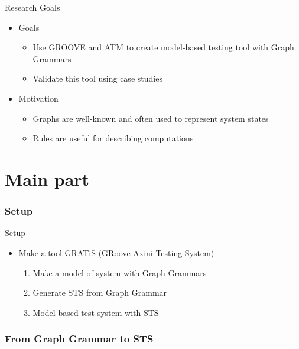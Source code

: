 \documentclass{FMTslides}
\begin{document}
\begin{frame}{Research Goals}
\begin{itemize}[<+->]
  \item Goals
  \begin{itemize}
    \item Use GROOVE and ATM to create model-based testing tool with Graph Grammars
    \item Validate this tool using case studies
  \end{itemize}
  \item Motivation
  \begin{itemize}
    \item Graphs are well-known and often used to represent system states
    \item Rules are useful for describing computations
  \end{itemize}
\end{itemize}
\end{frame}

\part{Main part}


\makecontentsslide

\section[Setup]{Setup}

\begin{frame}{Setup}
\begin{itemize}[<+->]
  \item Make a tool GRATiS (GRoove-Axini Testing System)
  \begin{enumerate}
    \item Make a model of system with Graph Grammars
    \item Generate STS from Graph Grammar
    \item Model-based test system with STS
  \end{enumerate}
\end{itemize}
\end{frame}

\section[GG2STS]{From Graph Grammar to STS}
\end{document}
